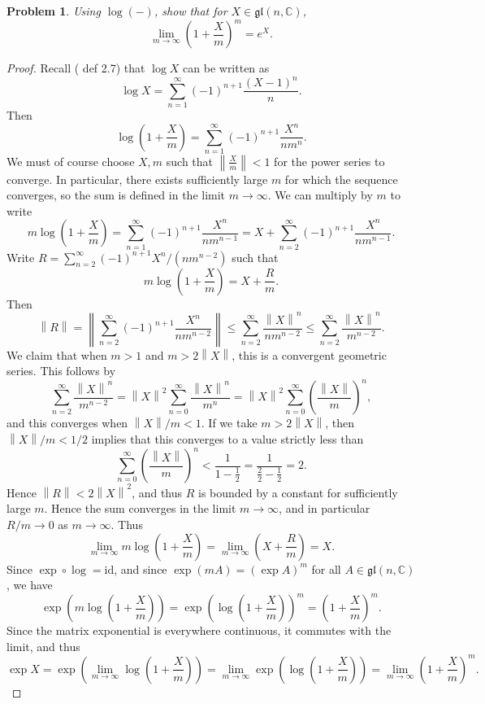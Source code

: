 \documentclass[11pt, letterpaper]{article}
\theoremstyle{plain}
\newtheorem{problem}{Problem}
\begin{document}
\begin{problem}\label{2}
	Using $\log (-)$, show that for $X\in \mathfrak{gl} (n,\mathbb{C} )$,
	\[
		\lim_{m\to \infty } \left( 1+\frac{X}{m}  \right) ^m = e^X
	.\]
\end{problem}
\begin{proof}
	Recall (\cite{hall} def 2.7) that $\log X$ can be written as
	\[
		\log X=\sum_{n=1}^{\infty} (-1)^{n+1} \frac{(X-1)^n}{n}
	.\]
	Then
	\[
		\log\left( 1+\frac{X}{m}  \right) =\sum_{n=1}^{\infty} (-1)^{n+1} \frac{X^n}{nm^n} 
	.\]
	We must of course choose $X,m$ such that $\left\| \frac{X}{m}  \right\| <1$ for the power series to converge. In particular, there exists sufficiently large $m$ for which the sequence converges, so the sum is defined in the limit $m\to \infty $. We can multiply by $m$ to write
	\[
		m \log \left( 1+\frac{X}{m}  \right) =\sum_{n=1}^{\infty } (-1)^{n+1} \frac{X^n}{nm^{n-1} } =X + \sum_{n=2}^{\infty} (-1)^{n+1} \frac{X^n}{nm^{n-1} } 
	.\]
	Write $R=\sum_{n=2}^{\infty} (-1)^{n+1} X^n/(nm^{n-2} )$ such that
	\[
		m \log \left( 1+\frac{X}{m}  \right) =X + \frac{R}{m} 
	.\]
	Then
	\[
		\left\| R \right\| =\left\| \sum_{n=2}^{\infty} (-1)^{n+1} \frac{X^n}{nm^{n-2} }  \right\| \leq \sum_{n=2}^{\infty} \frac{\left\| X \right\| ^n}{nm^{n-2}} \leq \sum_{n=2}^{\infty} \frac{\left\| X \right\| ^n}{m^{n-2} } 
	.\]
	We claim that when $m>1$ and $m > 2\left\| X \right\| $, this is a convergent geometric series. This follows by
	\[
		\sum_{n=2}^{\infty} \frac{\left\| X \right\| ^n}{m^{n-2} } =\left\| X \right\| ^2 \sum_{n=0}^{\infty} \frac{\left\| X \right\| ^n}{m^n} =\left\| X \right\| ^2\sum_{n=0}^{\infty} \left( \frac{\left\| X \right\| }{m}  \right) ^n,
	\]
	and this converges when $\left\| X \right\| /m < 1$. If we take $m > 2\left\| X \right\| $, then $\left\| X \right\| /m < 1/2$ implies that this converges to a value strictly less than
	\[
		\sum_{n=0}^{\infty} \left( \frac{\left\| X \right\| }{m}  \right) ^n < \frac{1}{1-\frac{1}{2} } =\frac{1}{\frac{2}{2} -\frac{1}{2} } =2
	.\]
	Hence $\left\| R \right\| < 2\left\| X \right\|^2 $, and thus $R$ is bounded by a constant for sufficiently large $m$. Hence the sum converges in the limit $m\to \infty $, and in particular $R/m \to 0$ as $m\to \infty $. Thus
	\[
		\lim _{m\to \infty } m \log \left( 1+\frac{X}{m}  \right) =\lim_{m\to \infty } \left( X + \frac{R}{m}  \right) =X
	.\]
	Since $\exp \circ\log =\mathrm{id} $, and since $\exp (mA)=(\exp A)^m$ for all $A\in \mathfrak{gl} (n,\mathbb{C} )$, we have
	\[
		\exp \left( m \log \left( 1+\frac{X}{m}  \right)  \right) =\exp \left( \log \left( 1+\frac{X}{m}  \right)  \right) ^m=\left( 1+\frac{X}{m}  \right) ^m
	.\]
	Since the matrix exponential is everywhere continuous, it commutes with the limit, and thus
	\[
		\exp X = \exp \left( \lim _{m\to \infty } \log \left( 1+\frac{X}{m}  \right)  \right) =\lim _{m\to \infty } \exp \left( \log \left( 1+\frac{X}{m}  \right)  \right) =\lim_{m\to \infty } \left( 1+\frac{X}{m}  \right) ^m
	.\]
\end{proof}




\end{document}
